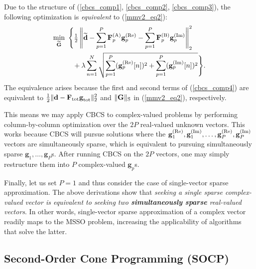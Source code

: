 \documentclass[final]{siamltex}
\newcommand{\la}[1]{\mbox{$\mathbf{#1}$}}  \newcommand{\sst}[1]{\mbox{\scriptsize{#1}}}
\begin{document}
   Due to the structure of (\ref{cbcs_comp1}, \ref{cbcs_comp2},
   \ref{cbcs_comp3}), the following optimization is {\em{equivalent}}
   to (\ref{mmv2_eq2}):
   \begin{equation}\label{cbcs_comp4}
     \begin{split}
     \mathop{\mbox{min}}_{\mbox{\scriptsize{$\widetilde{\la{G}}$}}} \mbox{ }
       &\Bigg\{  \tfrac{1}{2}  \left \Vert \widetilde{\la{d}} -
                      \sum_{p=1}^P \la{F}_p^{\sst{(A)}} \la{g}_p^{\sst{(Re)}} -
                      \sum_{p=1}^P \la{F}_p^{\sst{(B)}} \la{g}_p^{\sst{(Im)}}
                      \right \Vert_2^2 \\
      & \,\,\,\, + \lambda  \sum_{n=1}^{N} \sqrt{  \sum_{p=1}^P (\la{g}_p^{\sst{(Re)}}[n])^2 + 
                                            \sum_{p=1}^P (\la{g}_p^{\sst{(Im)}}[n])^2   } \Bigg\}.
     \end{split}
   \end{equation}
   The equivalence arises because the first and second terms of
   (\ref{cbcs_comp4}) are equivalent to $\frac{1}{2} \Vert \la{d} -
   \la{F}_{\sst{tot}} \la{g}_{\sst{tot}} \Vert_2^2$ and $\Vert \la{G}
   \Vert_{\sst{S}}$ in (\ref{mmv2_eq2}), respectively.

   This means we may apply CBCS to complex-valued problems by
   performing column-by-column optimization over the $2P$ real-valued
   unknown vectors.  This works because CBCS will
   pursue solutions where the $\la{g}_1^{\sst{(Re)}},
   \la{g}_1^{\sst{(Im)}}, \ldots, \la{g}_P^{\sst{(Re)}},
   \la{g}_P^{\sst{(Im)}}$ vectors are simultaneously sparse, which is
   equivalent to pursuing simultaneously sparse $\la{g}_1, \ldots,
   \la{g}_P$s.  After running CBCS on the $2P$ vectors, one may simply
   restructure them into $P$ complex-valued $\la{g}_p$s.

   Finally, let us set $P = 1$ and thus consider the case of
   single-vector sparse approximation.  The above derivations show
   that {\em{seeking a single sparse complex-valued vector is
   equivalent to seeking two {\bf{simultaneously sparse}} real-valued
   vectors}}.  In other words, single-vector sparse approximation of a
   complex vector readily maps to the MSSO problem, increasing the
   applicability of algorithms that solve the latter.

\subsection{Second-Order Cone Programming (SOCP)}
\label{subsec:socp}
\end{document}
